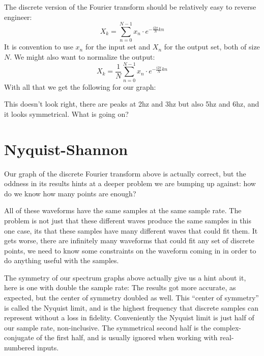 \documentclass[12pt]{article}
\begin{document}

\begin{multicols}{2}
\end{multicols}
{\begin{multicols}{2}
  \raggedcolumns
  The discrete version of the Fourier transform should be relatively easy to reverse engineer:
  \begin{displaymath}
    X_k = \sum_{n=0}^{N-1} x_n \cdot e^{-\frac{i2\pi}{N}kn}
  \end{displaymath}
  It is convention to use $x_n$ for the input set and $X_n$ for the output set, both of size $N$. We might also want to normalize the output:
  \begin{displaymath}
    X_k = \frac{1}{N} \sum_{n=0}^{N-1} x_n \cdot e^{-{\frac{i2\pi}{N}kn}}
  \end{displaymath}
  With all that we get the following for our graph:

\end{multicols}}

This doesn't look right, there are peaks at 2hz and 3hz but also 5hz and 6hz, and it looks symmetrical. What is going on?

\pagebreak

\section{Nyquist-Shannon}

Our graph of the discrete Fourier transform above is actually correct, but the oddness in its results hints at a deeper problem we are bumping up against: how do we know how many points are enough?

\criticalFrequency{}

All of these waveforms have the same samples at the same sample rate. The problem is not just that these different waves produce the same samples in this one case, its that these samples have many different waves that could fit them. It gets worse, there are infinitely many waveforms that could fit any set of discrete points, we need to know some constraints on the waveform coming in in order to do anything useful with the samples.

The symmetry of our spectrum graphs above actually give us a hint about it, here is one with double the sample rate:
The results got more accurate, as expected, but the center of symmetry doubled as well. This ``center of symmetry'' is called the Nyquist limit, and is the highest frequency that discrete samples can represent without a loss in fidelity. Conveniently the Nyquist limit is just half of our sample rate, non-inclusive. The symmetrical second half is the complex-conjugate of the first half, and is usually ignored when working with real-numbered inputs.
\end{document}
